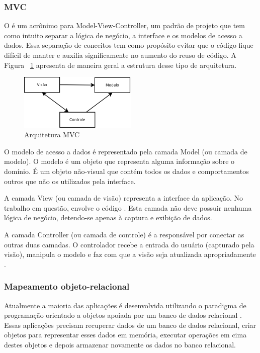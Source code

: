 \subsubsection{MVC}
O  \cite{Fowler:2006} é um acrônimo para Model-View-Controller, um padrão de projeto que tem como intuito
separar a lógica de negócio, a interface e os modelos de acesso a dados. Essa separação
de conceitos tem como propósito evitar que o código fique difícil de manter e auxilia
significamente no aumento do reuso de código. A Figura ~\ref{fig:diag_mvc} apresenta de maneira
geral a estrutura desse tipo de arquitetura.

\begin{figure}[htbp]
\centering
\includegraphics[width=0.5\textwidth]{fig/diagrama_mvc.png}
\caption{Arquitetura MVC}
\label{fig:diag_mvc}
\end{figure}

O modelo de acesso a dados é representado pela camada Model (ou camada de modelo). O modelo 
é um objeto que representa alguma informação sobre o domínio. É um objeto não-visual 
que contém todos os dados e comportamentos outros que não os utilizados 
pela interface.

A camada View (ou camada de visão) representa a interface da aplicação. No trabalho
em questão, envolve o código . Esta camada não deve possuir nenhuma lógica de negócio,
detendo-se apenas à captura e exibição de dados.

A camada Controller (ou camada de controle) é a responsável por conectar as outras duas
camadas. O controlador recebe a entrada do usuário (capturado pela visão), manipula o 
modelo e faz com que a visão seja atualizada apropriadamente \cite{Fowler:2006}.

\subsubsection{Mapeamento objeto-relacional}
Atualmente a maioria das aplicações é desenvolvida utilizando o paradigma de programa\-ção 
orientado a objetos \cite{Korson:1990:UOU:83880.84459} apoiada por um banco de dados relacional \cite{Codd:1990:RMD:77708}.
Essas aplicações precisam recuperar dados de um banco de dados relacional, criar objetos para representar esses dados em memória,
executar operações em cima destes objetos e depois armazenar novamente os dados no banco relacional.

